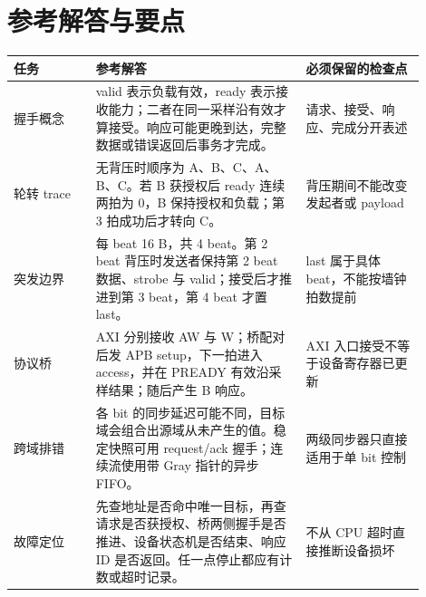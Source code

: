 \section*{参考解答与要点}

\begin{longtable}{L{0.18\linewidth}L{0.46\linewidth}L{0.26\linewidth}}
\toprule
任务 & 参考解答 & 必须保留的检查点 \\
\midrule
握手概念 & valid 表示负载有效，ready 表示接收能力；二者在同一采样沿有效才算接受。响应可能更晚到达，完整数据或错误返回后事务才完成。 & 请求、接受、响应、完成分开表述 \\
轮转 trace & 无背压时顺序为 A、B、C、A、B、C。若 B 获授权后 ready 连续两拍为 0，B 保持授权和负载；第 3 拍成功后才转向 C。 & 背压期间不能改变发起者或 payload \\
突发边界 & 每 beat 16 B，共 4 beat。第 2 beat 背压时发送者保持第 2 beat 数据、strobe 与 valid；接受后才推进到第 3 beat，第 4 beat 才置 last。 & last 属于具体 beat，不能按墙钟拍数提前 \\
协议桥 & AXI 分别接收 AW 与 W；桥配对后发 APB setup，下一拍进入 access，并在 PREADY 有效沿采样结果；随后产生 B 响应。 & AXI 入口接受不等于设备寄存器已更新 \\
跨域排错 & 各 bit 的同步延迟可能不同，目标域会组合出源域从未产生的值。稳定快照可用 request/ack 握手；连续流使用带 Gray 指针的异步 FIFO。 & 两级同步器只直接适用于单 bit 控制 \\
故障定位 & 先查地址是否命中唯一目标，再查请求是否获授权、桥两侧握手是否推进、设备状态机是否结束、响应 ID 是否返回。任一点停止都应有计数或超时记录。 & 不从 CPU 超时直接推断设备损坏 \\
\bottomrule
\end{longtable}
